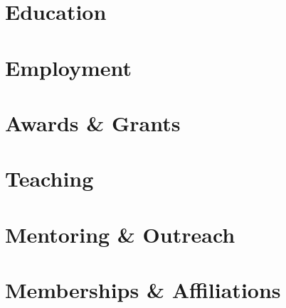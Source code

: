 \documentclass{helvetica_neue_cv}
\begin{document}
\makecvheader

\section{Education}


\section{Employment}


\section{Awards \& Grants}


\section{Teaching}


% 

\section{Mentoring \& Outreach}


\section{Memberships \& Affiliations}


% 
\end{document}
